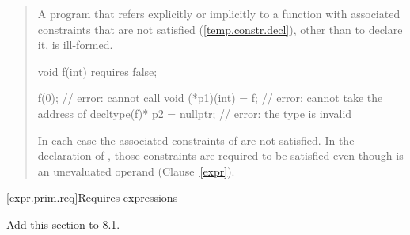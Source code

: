 \begin{quote}
\begin{addedblock}
\pnum
A program that refers explicitly or implicitly to a function with associated 
constraints that are not satisfied (\ref{temp.constr.decl}), other than to 
declare it, is ill-formed.
% 
\enterexample
\begin{codeblock}
void f(int) requires false;

f(0);                      // error: cannot call 
void (*p1)(int) = f;       // error: cannot take the address of 
decltype(f)* p2 = nullptr; // error: the type  is invalid
\end{codeblock}
In each case the associated constraints of  are not satisfied. In the 
declaration of , those constraints are required to be satisfied even 
though  is an unevaluated operand (Clause~\ref{expr}).
\exitexample
\end{addedblock}
\end{quote}

\setcounter{subsection}{6}
[expr.prim.req]{Requires expressions}

Add this section to 8.1.

